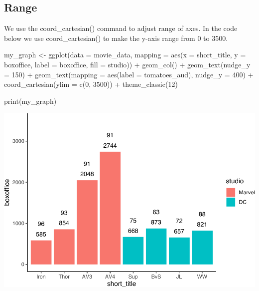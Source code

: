 \documentclass[
]{krantz}
\makeatletter
\newenvironment{Shaded}{\begin{snugshade}}{\end{snugshade}}
\newcommand{\AttributeTok}[1]{\textcolor[rgb]{0.61,0.61,0.61}{#1}}
\newcommand{\DecValTok}[1]{\textcolor[rgb]{0.06,0.06,0.06}{#1}}
\newcommand{\FunctionTok}[1]{\textcolor[rgb]{0,0,0}{#1}}
\newcommand{\NormalTok}[1]{#1}
\newcommand{\OtherTok}[1]{\textcolor[rgb]{0.37,0.37,0.37}{#1}}
\newcommand{\SpecialCharTok}[1]{\textcolor[rgb]{0,0,0}{#1}}
\newenvironment{kframe}{%
\medskip{}
\setlength{\fboxsep}{.8em}
 \def\at@end@of@kframe{}%
 \ifinner\ifhmode%
  \def\at@end@of@kframe{\end{minipage}}%
  \begin{minipage}{\columnwidth}%
 \fi\fi%
 \def\FrameCommand##1{\hskip\@totalleftmargin \hskip-\fboxsep
 \colorbox{shadecolor}{##1}\hskip-\fboxsep
     \hskip-\linewidth \hskip-\@totalleftmargin \hskip\columnwidth}%
 \MakeFramed {\advance\hsize-\width
   \@totalleftmargin\z@ \linewidth\hsize
   \@setminipage}}%
 {\par\unskip\endMakeFramed%
 \at@end@of@kframe}
\renewenvironment{Shaded}{\begin{kframe}}{\end{kframe}}
\makeatother
\begin{document}
\hypertarget{range}{%
\subsection{Range}\label{range}}

We use the coord\_cartesian() command to adjust range of axes. In the code below we use coord\_cartesian() to make the y-axis range from 0 to 3500.

\begin{Shaded}
\begin{Highlighting}[]
\NormalTok{my\_graph }\OtherTok{\textless{}{-}} \FunctionTok{ggplot}\NormalTok{(}\AttributeTok{data =}\NormalTok{ movie\_data,}
           \AttributeTok{mapping =} \FunctionTok{aes}\NormalTok{(}\AttributeTok{x =}\NormalTok{ short\_title,}
                         \AttributeTok{y =}\NormalTok{ boxoffice,}
                         \AttributeTok{label =}\NormalTok{ boxoffice, }
                         \AttributeTok{fill =}\NormalTok{ studio)) }\SpecialCharTok{+}
  \FunctionTok{geom\_col}\NormalTok{() }\SpecialCharTok{+}
  \FunctionTok{geom\_text}\NormalTok{(}\AttributeTok{nudge\_y =} \DecValTok{150}\NormalTok{)  }\SpecialCharTok{+}
  \FunctionTok{geom\_text}\NormalTok{(}\AttributeTok{mapping =} \FunctionTok{aes}\NormalTok{(}\AttributeTok{label =}\NormalTok{ tomatoes\_aud), }
            \AttributeTok{nudge\_y =} \DecValTok{400}\NormalTok{) }\SpecialCharTok{+}
  \FunctionTok{coord\_cartesian}\NormalTok{(}\AttributeTok{ylim =} \FunctionTok{c}\NormalTok{(}\DecValTok{0}\NormalTok{, }\DecValTok{3500}\NormalTok{)) }\SpecialCharTok{+}
  \FunctionTok{theme\_classic}\NormalTok{(}\DecValTok{12}\NormalTok{)}


\FunctionTok{print}\NormalTok{(my\_graph)}
\end{Highlighting}
\end{Shaded}

\includegraphics[width=0.65\linewidth]{bookdown_files/figure-latex/unnamed-chunk-206-1}
\end{document}
